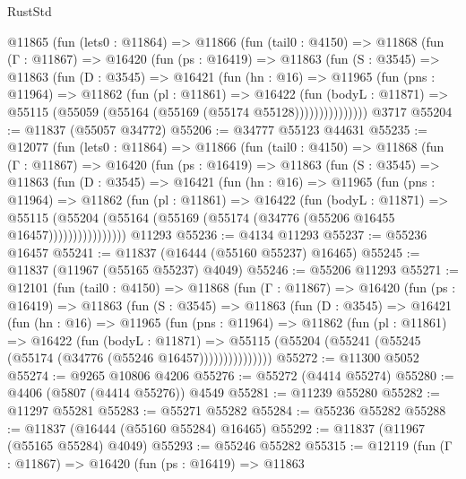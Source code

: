 \begin{lexlean}{RustStd}
\begin{coremodule}
{\begin{coremodule}
{{{{{{{{{{{{{{{{{{{{{{{{{{{{{{{{{{{{{{{{{{{{{{{{{{    @11865
      (fun (lets0 : @11864) =>
      @11866
        (fun (tail0 : @4150) =>
        @11868
          (fun (Γ : @11867) =>
          @16420
            (fun (ps : @16419) =>
            @11863
              (fun (S : @3545) =>
              @11863
                (fun (D : @3545) =>
                @16421
                  (fun (hn : @16) =>
                  @11965
                    (fun (pns : @11964) =>
                    @11862
                      (fun (pl : @11861) =>
                      @16422
                        (fun (bodyL : @11871) =>
                        @55115 (@55059 (@55164 (@55169 (@55174 @55128)))))))))))))))
    @3717
@55204 := @11837 (@55057 @34772)
@55206 := @34777 @55123 @44631
@55235 := @12077
    (fun (lets0 : @11864) =>
    @11866
      (fun (tail0 : @4150) =>
      @11868
        (fun (Γ : @11867) =>
        @16420
          (fun (ps : @16419) =>
          @11863
            (fun (S : @3545) =>
            @11863
              (fun (D : @3545) =>
              @16421
                (fun (hn : @16) =>
                @11965
                  (fun (pns : @11964) =>
                  @11862
                    (fun (pl : @11861) =>
                    @16422
                      (fun (bodyL : @11871) =>
                      @55115
                        (@55204
                          (@55164 (@55169 (@55174 (@34776 (@55206 @16455 @16457))))))))))))))))
    @11293
@55236 := @4134 @11293
@55237 := @55236 @16457
@55241 := @11837 (@16444 (@55160 @55237) @16465)
@55245 := @11837 (@11967 (@55165 @55237) @4049)
@55246 := @55206 @11293
@55271 := @12101
    (fun (tail0 : @4150) =>
    @11868
      (fun (Γ : @11867) =>
      @16420
        (fun (ps : @16419) =>
        @11863
          (fun (S : @3545) =>
          @11863
            (fun (D : @3545) =>
            @16421
              (fun (hn : @16) =>
              @11965
                (fun (pns : @11964) =>
                @11862
                  (fun (pl : @11861) =>
                  @16422
                    (fun (bodyL : @11871) =>
                    @55115 (@55204 (@55241 (@55245 (@55174 (@34776 (@55246 @16457)))))))))))))))
@55272 := @11300 @5052
@55274 := @9265 @10806 @4206
@55276 := @55272 (@4414 @55274)
@55280 := @4406 (@5807 (@4414 @55276)) @4549
@55281 := @11239 @55280
@55282 := @11297 @55281
@55283 := @55271 @55282
@55284 := @55236 @55282
@55288 := @11837 (@16444 (@55160 @55284) @16465)
@55292 := @11837 (@11967 (@55165 @55284) @4049)
@55293 := @55246 @55282
@55315 := @12119
    (fun (Γ : @11867) =>
    @16420
      (fun (ps : @16419) =>
      @11863
}}}}}}}}}}}}}}}}}}}}}}}}}}}}}}}}}}}}}}}}}}}}}}}}}}
\end{coremodule}}
\end{coremodule}
\end{lexlean}

